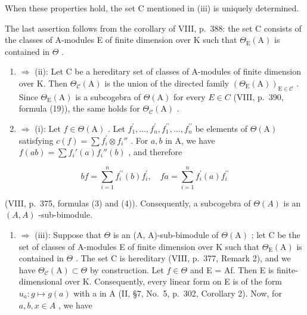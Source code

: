 When these properties hold, the set C mentioned in (iii) is uniquely determined.

The last assertion follows from the corollary of VIII, p.~388: the set C consists of the classes of A-modules E of finite dimension over K such that \(\Theta_{\mathrm{E}}(\mathrm{A})\) is contained in \(\Theta\) .

\begin{enumerate}
\def\labelenumi{(\roman{enumi})}
\setcounter{enumi}{2}
\item
  \(\Rightarrow\) (ii): Let C be a hereditary set of classes of A-modules of finite dimension over K. Then \(\Theta_{\mathcal{C}}(\mathrm{A})\) is the union of the directed family \((\Theta_{\mathrm{E}}(\mathrm{A}))_{\mathrm{E}\in\mathcal{C}}\) . Since \(\Theta_{\mathrm{E}}(\mathrm{A})\) is a subcogebra of \(\Theta(\mathrm{A})\) for every \(E\in C\) (VIII, p.~390, formula (19)), the same holds for \(\Theta_{\mathcal{C}}(\mathrm{A})\) .
\item
  \(\Rightarrow\) (i): Let \(f\in \Theta (\mathrm{A})\) . Let \(f_{1}^{\prime},\ldots ,f_{n}^{\prime},f_{1}^{\prime \prime},\ldots ,f_{n}^{\prime \prime}\) be elements of \(\Theta (\mathrm{A})\) satisfying \(c(f) = \sum f_i^\prime \otimes f_i''\) . For \(a,b\) in A, we have \(f(ab) = \sum f_i'(a)f_i''(b)\) , and therefore
\end{enumerate}

\[
b f = \sum_ {i = 1} ^ {n} f _ {i} ^ {\prime \prime} (b) f _ {i} ^ {\prime}, \quad f a = \sum_ {i = 1} ^ {n} f _ {i} ^ {\prime} (a) f _ {i} ^ {\prime \prime}
\]

(VIII, p.~375, formulas (3) and (4)). Consequently, a subcogebra of \(\Theta(A)\) is an \((A, A)\) -sub-bimodule.

\begin{enumerate}
\def\labelenumi{(\roman{enumi})}
\tightlist
\item
  \(\Rightarrow\) (iii): Suppose that \(\Theta\) is an (A, A)-sub-bimodule of \(\Theta(\mathrm{A})\) ; let C be the set of classes of A-modules E of finite dimension over K such that \(\Theta_{\mathrm{E}}(\mathrm{A})\) is contained in \(\Theta\) . The set C is hereditary (VIII, p.~377, Remark 2), and we have \(\Theta_{\mathcal{C}}(\mathrm{A}) \subset \Theta\) by construction. Let \(f \in \Theta\) and E = Af. Then E is finite-dimensional over K. Consequently, every linear form on E is of the form \(u_{a}: g \mapsto g(a)\) with a in A (II, §7, No.~5, p.~302, Corollary 2). Now, for \(a, b, x \in A\) , we have
\end{enumerate}

